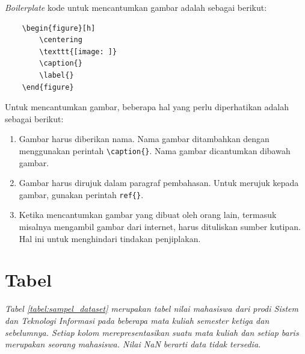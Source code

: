 \textit{Boilerplate} kode untuk mencantumkan gambar adalah sebagai berikut:

\begin{verbatim}
    \begin{figure}[h]
        \centering
      	\texttt{[image: ]}
      	\caption{}
      	\label{}
    \end{figure}
\end{verbatim}

Untuk mencantumkan gambar, beberapa hal yang perlu diperhatikan adalah sebagai berikut:

\begin{enumerate}
    \item Gambar harus diberikan nama. Nama gambar ditambahkan dengan menggunakan perintah \verb|\caption{}|. Nama gambar dicantumkan dibawah gambar.
    \item Gambar harus dirujuk dalam paragraf pembahasan. Untuk merujuk kepada gambar, gunakan perintah \verb|ref{}|. 
    \item Ketika mencantumkan gambar yang dibuat oleh orang lain, termasuk misalnya mengambil gambar dari internet, harus dituliskan sumber kutipan. Hal ini untuk menghindari tindakan penjiplakan. 
\end{enumerate}

\section{Tabel}

\textit{Tabel \ref{tabel:sampel_dataset} merupakan tabel nilai mahasiswa dari prodi Sistem dan Teknologi Informasi pada beberapa mata kuliah semester ketiga dan sebelumnya. Setiap kolom merepresentasikan suatu mata kuliah dan setiap baris merupakan seorang mahasiswa. Nilai NaN berarti data tidak tersedia.}

